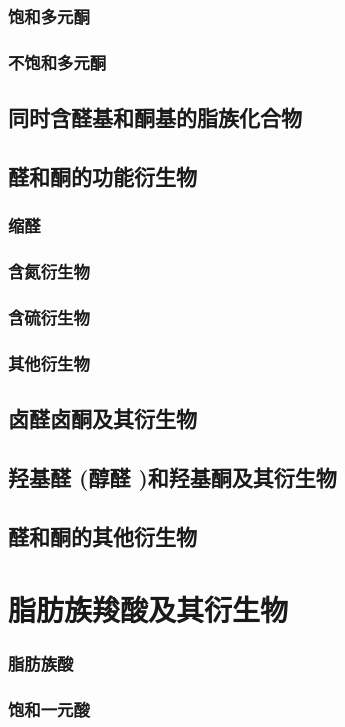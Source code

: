 \documentclass[UTF8]{../03-Chemistry}
\begin{document}
        \subsubsection{饱和多元酮}
        \subsubsection{不饱和多元酮}
    \subsection{同时含醛基和酮基的脂族化合物}
    \subsection{醛和酮的功能衍生物}
        \subsubsection{缩醛}
        \subsubsection{含氮衍生物}
        \subsubsection{含硫衍生物}
        \subsubsection{其他衍生物}
    \subsection{卤醛卤酮及其衍生物}
    \subsection{羟基醛 (醇醛 )和羟基酮及其衍生物}
    \subsection{醛和酮的其他衍生物}


\section{脂肪族羧酸及其衍生物}
    \subsubsection{脂肪族酸}
        \subsubsection{饱和一元酸}
\end{document}
